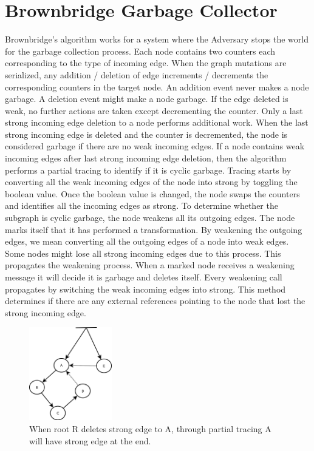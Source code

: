 \section{Brownbridge Garbage Collector}
Brownbridge's algorithm works for a system where the Adversary stops the world for the garbage collection process. Each node contains two counters each corresponding to the type of incoming edge. When the graph mutations are serialized, any addition / deletion of edge increments / decrements the corresponding counters in the target node. An addition event never makes a node garbage. A deletion event might make a node garbage. If the edge deleted is weak, no further actions are taken except decrementing the counter. Only a last strong incoming edge deletion to a node performs additional work. When the last strong incoming edge is deleted and the counter is decremented, the node is considered garbage if there are no weak incoming edges. If a node contains weak incoming edges after last strong incoming edge deletion, then the algorithm performs a partial tracing to identify if it is cyclic garbage. Tracing starts by converting all the weak incoming edges of the node into strong by toggling the boolean value. Once the boolean value is changed, the node swaps the counters and identifies all the incoming edges as strong. To determine whether the subgraph is cyclic garbage, the node weakens all its outgoing edges. The node marks itself that it has performed a transformation. By weakening the outgoing edges, we mean converting all the outgoing edges of a node into weak edges. Some nodes might lose all strong incoming edges due to this process. This propagates the weakening process. When a marked node receives a weakening message it will decide it is garbage and deletes itself. Every weakening call propagates by switching the weak incoming edges into strong. This method determines if there are any external references pointing to the node that lost the strong incoming edge. 

\begin{figure}[!t]
	\centering
	\includegraphics[width=0.32\textwidth]{figs/brownbridge}
	\caption{When root R deletes strong edge to A, through partial tracing A will have strong edge at the end.}
	\label{brownbridge}
\end{figure}

